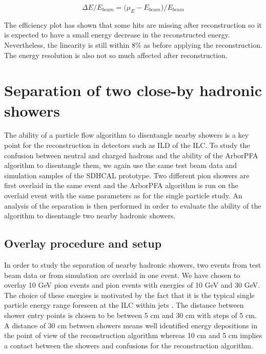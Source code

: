 \documentclass[cits]{JINST}
\begin{document}
\begin{equation}
  \Delta E/E_{beam} = \Big(\mu_{E} - E_{beam}\Big)/E_{beam}
\end{equation}

The efficiency plot has shown that some hits are missing after reconstruction so it is expected to have a small energy decrease in the reconstructed energy. Nevertheless, the linearity is still within 8\% as before applying the reconstruction. The energy resolution is also not so much affected after reconstruction.

\section{Separation of two close-by hadronic showers}
\label{OVERLAY_EVENT_SECTION}

The ability of a particle flow algorithm to disentangle nearby showers is a key point for the reconstruction in detectors such as ILD of the ILC. To study the confusion between neutral and charged hadrons and the ability of the ArborPFA algorithm to disentangle them, we again use the same test beam data and simulation samples of the SDHCAL prototype. Two different pion showers are first overlaid in the same event and the ArborPFA algorithm is run on the overlaid event with the same parameters as for the single particle study. An analysis of the separation is then performed in order to evaluate the ability of the algorithm to disentangle two nearby hadronic showers.

\subsection{Overlay procedure and setup}

In order to study the separation of nearby hadronic showers, two events from test beam data or from simulation are overlaid in one event. We have chosen to overlay 10 GeV pion events and pion events with energies of 10 GeV and 30 GeV. The choice of these energies is motivated by the fact that it is the typical single particle energy range foreseen at the ILC within jets \cite{hadron-jets}. The distance between shower entry points is chosen to be between 5 cm and 30 cm with steps of 5 cm. A distance of 30 cm between showers means well identified energy depositions in the point of view of the reconstruction algorithm whereas 10 cm and 5 cm implies a contact between the showers and confusions for the reconstruction algorithm. 
\end{document}
